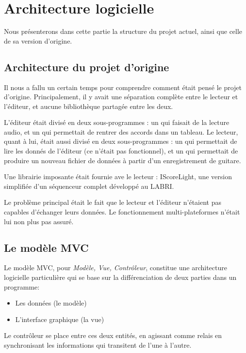 \section{Architecture logicielle}

Nous présenterons dans cette partie la structure du projet actuel, ainsi que celle de sa version d'origine.

\subsection{Architecture du projet d'origine}

Il nous a fallu un certain temps pour comprendre comment était pensé le projet d'origine. Principalement, il y avait une séparation complète entre le lecteur et l'éditeur, et aucune bibliothèque partagée entre les deux.

L'éditeur était divisé en deux sous-programmes : un qui faisait de la lecture audio, et un qui permettait de rentrer des accords dans un
tableau. Le lecteur, quant à lui, était aussi divisé en deux sous-programmes : un qui permettait de lire les donnés de l'éditeur (ce n'était pas fonctionnel),
et un qui permettait de produire un nouveau fichier de données à partir d'un enregistrement de guitare.

Une librairie imposante était fournie ave le lecteur : IScoreLight, une version simplifiée d'un séquenceur complet développé au \ac{LABRI}.

Le problème principal était le fait que le lecteur et l'éditeur n'étaient pas capables d'échanger leurs données. Le fonctionnement multi-plateformes n'était lui non plus pas assuré.

\subsection{Le modèle \ac{MVC}}

Le modèle \ac{MVC}, pour \textit{Modèle, Vue, Contrôleur}, constitue une architecture logicielle particulière qui se base sur la différenciation de deux parties dans un programme:
\begin{itemize}
 \item Les données (le modèle)
 \item L'interface graphique (la vue)
\end{itemize}

Le contrôleur se place entre ces deux entités, en agissant comme relais en synchronisant les informations qui transitent de l'une à l'autre.

